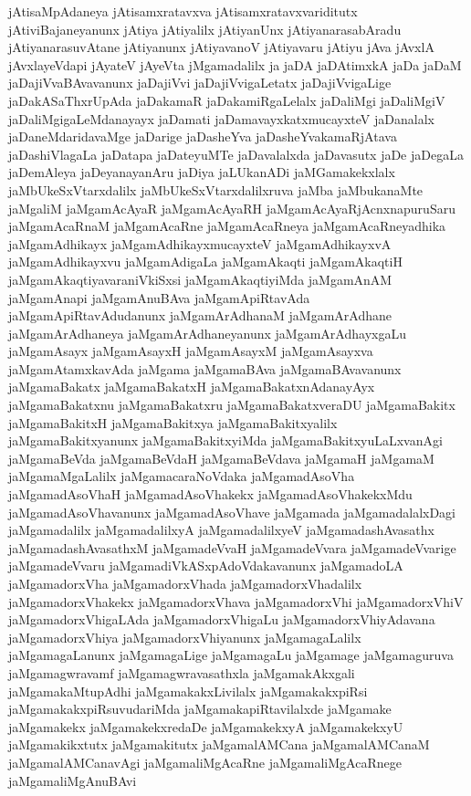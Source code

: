{jAtisaMpAdaneya
jAtisamxratavxva
jAtisamxratavxvariditutx
jAtiviBajaneyanunx
jAtiya
jAtiyalilx
jAtiyanUnx
jAtiyanarasabAradu
jAtiyanarasuvAtane
jAtiyanunx
jAtiyavanoV
jAtiyavaru
jAtiyu
jAva
jAvxlA
jAvxlayeVdapi
jAyateV
jAyeVta
jMgamadalilx
ja
jaDA
jaDAtimxkA
jaDa
jaDaM
jaDajiVvaBAvavanunx
jaDajiVvi
jaDajiVvigaLetatx
jaDajiVvigaLige
jaDakASaThxrUpAda
jaDakamaR
jaDakamiRgaLelalx
jaDaliMgi
jaDaliMgiV
jaDaliMgigaLeMdanayayx
jaDamati
jaDamavayxkatxmucayxteV
jaDanalalx
jaDaneMdaridavaMge
jaDarige
jaDasheYva
jaDasheYvakamaRjAtava
jaDashiVlagaLa
jaDatapa
jaDateyuMTe
jaDavalalxda
jaDavasutx
jaDe
jaDegaLa
jaDemAleya
jaDeyanayanAru
jaDiya
jaLUkanADi
jaMGamakekxlalx
jaMbUkeSxVtarxdalilx
jaMbUkeSxVtarxdalilxruva
jaMba
jaMbukanaMte
jaMgaliM
jaMgamAcAyaR
jaMgamAcAyaRH
jaMgamAcAyaRjAcnxnapuruSaru
jaMgamAcaRnaM
jaMgamAcaRne
jaMgamAcaRneya
jaMgamAcaRneyadhika
jaMgamAdhikayx
jaMgamAdhikayxmucayxteV
jaMgamAdhikayxvA
jaMgamAdhikayxvu
jaMgamAdigaLa
jaMgamAkaqti
jaMgamAkaqtiH
jaMgamAkaqtiyavaraniVkiSxsi
jaMgamAkaqtiyiMda
jaMgamAnAM
jaMgamAnapi
jaMgamAnuBAva
jaMgamApiRtavAda
jaMgamApiRtavAdudanunx
jaMgamArAdhanaM
jaMgamArAdhane
jaMgamArAdhaneya
jaMgamArAdhaneyanunx
jaMgamArAdhayxgaLu
jaMgamAsayx
jaMgamAsayxH
jaMgamAsayxM
jaMgamAsayxva
jaMgamAtamxkavAda
jaMgama
jaMgamaBAva
jaMgamaBAvavanunx
jaMgamaBakatx
jaMgamaBakatxH
jaMgamaBakatxnAdanayAyx
jaMgamaBakatxnu
jaMgamaBakatxru
jaMgamaBakatxveraDU
jaMgamaBakitx
jaMgamaBakitxH
jaMgamaBakitxya
jaMgamaBakitxyalilx
jaMgamaBakitxyanunx
jaMgamaBakitxyiMda
jaMgamaBakitxyuLaLxvanAgi
jaMgamaBeVda
jaMgamaBeVdaH
jaMgamaBeVdava
jaMgamaH
jaMgamaM
jaMgamaMgaLalilx
jaMgamacaraNoVdaka
jaMgamadAsoVha
jaMgamadAsoVhaH
jaMgamadAsoVhakekx
jaMgamadAsoVhakekxMdu
jaMgamadAsoVhavanunx
jaMgamadAsoVhave
jaMgamada
jaMgamadalalxDagi
jaMgamadalilx
jaMgamadalilxyA
jaMgamadalilxyeV
jaMgamadashAvasathx
jaMgamadashAvasathxM
jaMgamadeVvaH
jaMgamadeVvara
jaMgamadeVvarige
jaMgamadeVvaru
jaMgamadiVkASxpAdoVdakavanunx
jaMgamadoLA
jaMgamadorxVha
jaMgamadorxVhada
jaMgamadorxVhadalilx
jaMgamadorxVhakekx
jaMgamadorxVhava
jaMgamadorxVhi
jaMgamadorxVhiV
jaMgamadorxVhigaLAda
jaMgamadorxVhigaLu
jaMgamadorxVhiyAdavana
jaMgamadorxVhiya
jaMgamadorxVhiyanunx
jaMgamagaLalilx
jaMgamagaLanunx
jaMgamagaLige
jaMgamagaLu
jaMgamage
jaMgamaguruva
jaMgamagwravamf
jaMgamagwravasathxla
jaMgamakAkxgali
jaMgamakaMtupAdhi
jaMgamakakxLivilalx
jaMgamakakxpiRsi
jaMgamakakxpiRsuvudariMda
jaMgamakapiRtavilalxde
jaMgamake
jaMgamakekx
jaMgamakekxredaDe
jaMgamakekxyA
jaMgamakekxyU
jaMgamakikxtutx
jaMgamakitutx
jaMgamalAMCana
jaMgamalAMCanaM
jaMgamalAMCanavAgi
jaMgamaliMgAcaRne
jaMgamaliMgAcaRnege
jaMgamaliMgAnuBAvi
}

